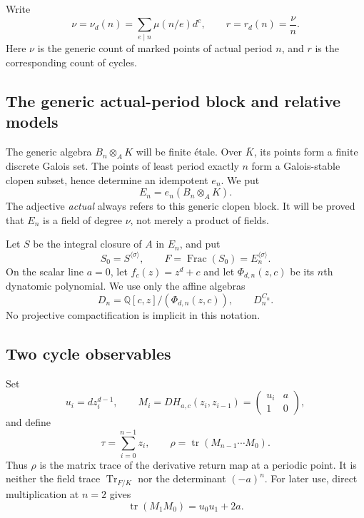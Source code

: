 \documentclass[11pt]{article}
\theoremstyle{definition}
\theoremstyle{remark}
\newcommand{\Q}{\mathbb{Q}}
\newcommand{\Kbar}{\overline{K}}
\newcommand{\Frac}{\operatorname{Frac}}
\newcommand{\Tr}{\operatorname{Tr}}
\newcommand{\etale}{\'{e}tale}
\begin{document}
Write
\begin{equation}\label{eq:nu-r}
 \nu=\nu_d(n)=\sum_{e\mid n}\mu(n/e)d^e,
 \qquad r=r_d(n)=\frac{\nu}{n}.
\end{equation}
Here $\nu$ is the generic count of marked points of actual period $n$, and
$r$ is the corresponding count of cycles.

\subsection{The generic actual-period block and relative models}

The generic algebra $B_n\otimes_AK$ will be finite \etale.  Over $\Kbar$,
its points form a finite discrete Galois set.  The points of least period
exactly $n$ form a Galois-stable clopen subset, hence determine an idempotent
$e_n$.  We put
\begin{equation}\label{eq:En}
 E_n=e_n(B_n\otimes_AK).
\end{equation}
The adjective \emph{actual} always refers to this generic clopen block.  It
will be proved that $E_n$ is a field of degree $\nu$, not merely a product of
fields.

Let $S$ be the integral closure of $A$ in $E_n$, and put
\begin{equation}\label{eq:S0F}
 S_0=S^{\langle\sigma\rangle},\qquad
 F=\Frac(S_0)=E_n^{\langle\sigma\rangle}.
\end{equation}
On the scalar line $a=0$, let $f_c(z)=z^d+c$ and let
$\Phi_{d,n}(z,c)$ be its $n$th dynatomic polynomial.  We use only the affine
algebras
\begin{equation}\label{eq:Dn}
 D_n=\Q[c,z]/(\Phi_{d,n}(z,c)),
 \qquad D_n^{C_n}.
\end{equation}
No projective compactification is implicit in this notation.

\subsection{Two cycle observables}

Set
\begin{equation}\label{eq:observables}
 u_i=d z_i^{d-1},\qquad
 M_i=DH_{a,c}(z_i,z_{i-1})=
 \begin{pmatrix}u_i&a\\1&0\end{pmatrix},
\end{equation}
and define
\begin{equation}\label{eq:tau-rho}
 \tau=\sum_{i=0}^{n-1}z_i,
 \qquad
 \rho=\operatorname{tr}(M_{n-1}\cdots M_0).
\end{equation}
Thus $\rho$ is the matrix trace of the derivative return map at a periodic
point.  It is neither the field trace $\Tr_{F/K}$ nor the determinant
$(-a)^n$.  For later use, direct multiplication at $n=2$ gives
\begin{equation}\label{eq:n2-matrix-check}
 \operatorname{tr}(M_1M_0)=u_0u_1+2a.
\end{equation}
\end{document}
